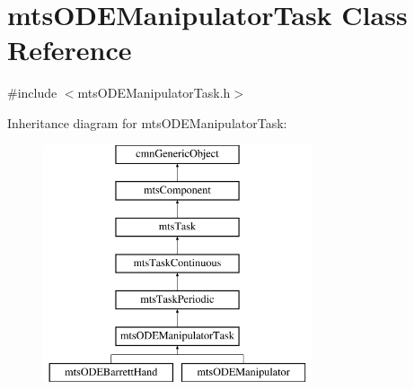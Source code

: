 \hypertarget{classmts_o_d_e_manipulator_task}{\section{mts\-O\-D\-E\-Manipulator\-Task Class Reference}
\label{classmts_o_d_e_manipulator_task}
}


{\ttfamily \#include $<$mts\-O\-D\-E\-Manipulator\-Task.\-h$>$}

Inheritance diagram for mts\-O\-D\-E\-Manipulator\-Task\-:\begin{figure}[H]
\begin{center}
\leavevmode
\includegraphics[height=7.000000cm]{d7/d85/classmts_o_d_e_manipulator_task}
\end{center}
\end{figure}
